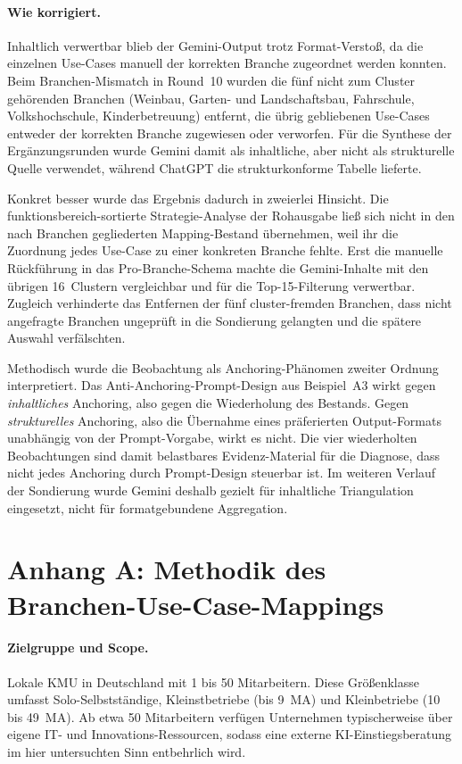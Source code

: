 \documentclass[a4paper,11pt]{article}
\begin{document}
\paragraph{Wie korrigiert.}
Inhaltlich verwertbar blieb der Gemini-Output trotz Format-Verstoß,
da die einzelnen Use-Cases manuell der korrekten Branche zugeordnet
werden konnten. Beim Branchen-Mismatch in Round~10 wurden die fünf
nicht zum Cluster gehörenden Branchen (Weinbau, Garten- und
Landschaftsbau, Fahrschule, Volkshochschule, Kinderbetreuung)
entfernt, die übrig gebliebenen Use-Cases entweder der korrekten
Branche zugewiesen oder verworfen. Für die Synthese der
Ergänzungsrunden wurde Gemini damit als inhaltliche, aber nicht als
strukturelle Quelle verwendet, während ChatGPT die strukturkonforme
Tabelle lieferte.

Konkret besser wurde das Ergebnis dadurch in zweierlei Hinsicht. Die
funktionsbereich-sortierte Strategie-Analyse der Rohausgabe ließ sich
nicht in den nach Branchen gegliederten Mapping-Bestand übernehmen,
weil ihr die Zuordnung jedes Use-Case zu einer konkreten Branche
fehlte. Erst die manuelle Rückführung in das Pro-Branche-Schema machte
die Gemini-Inhalte mit den übrigen 16~Clustern vergleichbar und für die
Top-15-Filterung verwertbar. Zugleich verhinderte das Entfernen der
fünf cluster-fremden Branchen, dass nicht angefragte Branchen
ungeprüft in die Sondierung gelangten und die spätere Auswahl
verfälschten.

Methodisch wurde die Beobachtung als Anchoring-Phänomen
zweiter Ordnung interpretiert. Das Anti-Anchoring-Prompt-Design aus
Beispiel~A3 wirkt gegen \emph{inhaltliches} Anchoring, also gegen die
Wiederholung des Bestands. Gegen \emph{strukturelles} Anchoring, also
die Übernahme eines präferierten Output-Formats unabhängig von der
Prompt-Vorgabe, wirkt es nicht. Die vier wiederholten Beobachtungen
sind damit belastbares Evidenz-Material für die Diagnose, dass nicht
jedes Anchoring durch Prompt-Design steuerbar ist. Im weiteren
Verlauf der Sondierung wurde Gemini deshalb gezielt für inhaltliche
Triangulation eingesetzt, nicht für formatgebundene Aggregation.

\newpage

\section*{Anhang A: Methodik des Branchen-Use-Case-Mappings}

\paragraph{Zielgruppe und Scope.}
Lokale KMU in Deutschland mit 1 bis 50 Mitarbeitern. Diese Größenklasse
umfasst Solo-Selbstständige, Kleinstbetriebe (bis 9~MA) und
Kleinbetriebe (10 bis 49~MA). Ab etwa 50 Mitarbeitern verfügen
Unternehmen typischerweise über eigene IT- und Innovations-Ressourcen,
sodass eine externe KI-Einstiegsberatung im hier untersuchten Sinn
entbehrlich wird.
\end{document}
